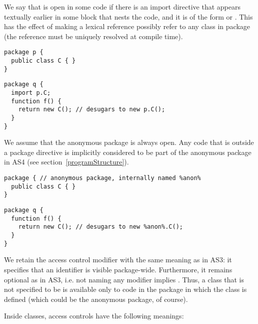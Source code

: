 We say that  is open in some code if there is an import
  directive that appears textually earlier in some block that nests the code, and
  it is of the form  or
  . This has the effect of making a lexical reference
  possibly refer to any
   class  in package  (the reference must
  be uniquely
  resolved at compile time).

\begin{minipage}{\linewidth}
\begin{verbatim}
package p {
  public class C { }
}
\end{verbatim}
\end{minipage}

\begin{minipage}{\linewidth}
\begin{verbatim}
package q {
  import p.C;
  function f() {
    return new C(); // desugars to new p.C();
  }
}
\end{verbatim}
\end{minipage}

We assume that the anonymous package is always open. Any code that is outside a
package directive is implicitly considered to be part of the anonymous package
in AS4 (see section~\ref{programStructure}).

\begin{minipage}{\linewidth}
\begin{verbatim}
package { // anonymous package, internally named %anon%
  public class C { }
}
\end{verbatim}
\end{minipage}

\begin{minipage}{\linewidth}
\begin{verbatim}
package q {
  function f() {
    return new C(); // desugars to new %anon%.C();
  }
}
\end{verbatim}
\end{minipage}

We retain the access control modifier  with the same meaning as
in AS3: it specifies that an identifier is visible package-wide. Furthermore, it
remains optional as in AS3, i.e. not naming any modifier implies
. Thus, a class  that is not specified to be  is available only
  to code in the package in which the class is defined (which could be the anonymous
  package, of course).

Inside classes, access controls have the following meanings:

